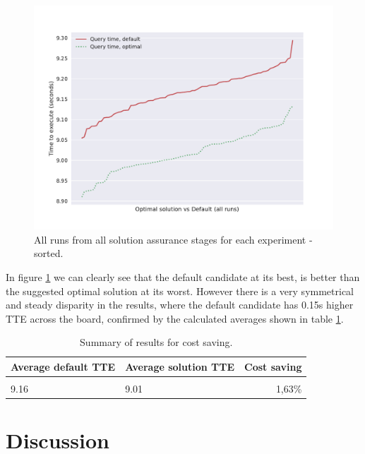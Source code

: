 \documentclass[a4paper,english]{report}
\begin{document}
	\begin{figure}[H]
		\centering
		\includegraphics[width=\textwidth]{costsaving2}
		\caption{All runs from all solution assurance stages for each experiment - sorted.}
		\label{fig:costsaving2}
	\end{figure}
	In figure \ref{fig:costsaving2} we can clearly see that the default candidate at its best, is better than the suggested optimal solution at its worst. However there is a very symmetrical and steady disparity in the results, where the default candidate has 0.15s higher TTE across the board, confirmed by the calculated averages shown in table \ref{table:costsaving}.
	\begin{table}[H]
	\centering
	\caption{Summary of results for cost saving.}
	\label{table:costsaving}
	\begin{tabular}{ll|r}
		\\
		\textbf{Average default TTE} & \textbf{Average solution TTE} & \textbf{Cost saving} \\ \hline \\
		9.16 & 9.01 & 1,63\% \\
	\end{tabular}
\end{table}
	\chapter{Discussion}
\end{document}
